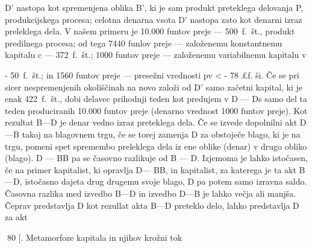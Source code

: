 \documentclass[kapital_02.tex]{subfiles}
\begin{document}
D' nastopa kot spremenjena oblika B', ki je sam produkt preteklega delovanja P, produkcijskega procesa; celotna denarna vsota D' nastopa zato kot denarni izraz preleklega dela. V našem primeru je 10.000 funtov preje — 500~f.~št., produkt predilnega procesa; od tega 7440 funlov preje — založenemu konstantnemu kapitalu c — 372~f.~št.; 1000 funtov preje — založenemu variabilnemu kapitalu v

- 50~f.~št.; in 1560 funtov preje — presežni vrednosti pv < - 78 £f. ši. Če se pri sicer nespremenjenih okoliščinah na novo založi od D' samo začetni kapital, ki je enak 422~f.~št., dobi delavec prihodnji teden kot predujem v D — Ds samo del ta teden produciranih 10.000 funtov preje (denarno vrednost 1000 funtov preje). Kot rezultat B—D je denar vedno izraz preteklega dela. Če se izvede dopolnilni akt D —B takoj na blagovnem trgu, če se torej zamenja D za obstoječe blago, ki je na trgu, pomeni spet spremembo preleklega dela iz ene oblike (denar) v drugo obliko (blago). D — BB pa se časovno razlikuje od B — D. Izjemoma je lahko istočasen, če na primer kapitalist, ki opravlja D— BB, in kapitalist, za katerega je ta akt B—D, istočasno dajeta drug drugemu svoje blago, D pa potem samo izravna saldo. Časovna razlika med izvedbo B—D in izvedbo D—B je lahko večja ali manjša. Čeprav predstavlja D kot rezullat akta B—D preteklo delo, lahko predstavlja D za akt



80 [. Metamorfoze kapitala in njihov krožni tok
\end{document}
